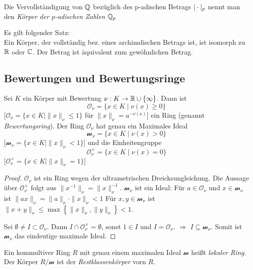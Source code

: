 \documentclass[../main.tex]{subfiles}
\begin{document}
\begin{definition}
    Die Vervollständigung von $\mathbb{Q}$ bezüglich des p-adischen Betrags $|\cdot|_p$ nennt man den \emph{Körper der $p$-adischen Zahlen} $\mathbb{Q}_p$
\end{definition}

\begin{remark}
    Es gilt folgender Satz:\\
    Ein Körper, der vollständig bez. eines archimdischen Betrags ist, ist isomorph zu $\mathbb{R}$ oder $\mathbb{C}$. Der Betrag ist äquivalent zum gewöhnlichen Betrag.
\end{remark}

\subsection{Bewertungen und Bewertungsringe}
\begin{theorem}\label{theo:4.23}
    Sei $K$ ein Körper mit Bewertung $\nu:K\rightarrow\mathbb{R}\cup \{\infty\}$.
    Dann ist $$\mathcal{O}_\nu = \{x\in K\mid \nu(x)\geq0\}$$ [$\mathcal{O}_\nu = \{x\in K\mid \|x\|_\nu \leq 1\}$ für $\|x\|_\nu = a^{-\nu(x)}$] ein Ring (genannt \emph{Bewertungsring}).
    Der Ring $\mathcal{O}_\nu$ hat genau ein Maximales Ideal $$\mathcal{m}_\nu = \{x\in K\mid \nu(x)>0\}$$ [$\mathcal{m}_\nu = \{x\in K\mid \|x\|_\nu <1\}$]
    und die Einheitengruppe $$\mathcal{O}_\nu^\times = \{x\in K\mid \nu(x) = 0\}$$ [$\mathcal{O}_\nu^\times = \{x\in K\mid \|x\|_\nu = 1\}$]
\end{theorem}
\begin{proof}
    $\mathcal{O}_\nu$ ist ein Ring wegen der ultrametrischen Dreicksungleichung.
    Die Aussage über $\mathcal{O}_\nu^\times$ folgt aus $\|x^{-1}\|_\nu = \|x\|_\nu^{-1}$.
    $\mathcal{m}_\nu$ ist ein Ideal: Für $a\in \mathcal{O}_\nu$ und $x\in \mathcal{m}_\nu$ ist $\|ax\|_\nu = \|a\|_\nu \cdot \|x\|_\nu < 1$
    Für $x,y\in \mathcal{m}_\nu$ ist $\|x+y\|_\nu \leq \max\left\{\|x\|_\nu, \|y\|_\nu\right\} < 1$.

    Sei $\emptyset\neq I\subset \mathcal{O}_\nu$. Dann $I\cap \mathcal{O}_\nu^\times = \emptyset$, sonst $1\in I$ und $I=\mathcal{O}_\nu$.
    $\Longrightarrow$ $I\subseteq \mathcal{m}_\nu$.
    Somit ist $\mathcal{m}_\nu$ das eindeutige maximale Ideal.
\end{proof}

\begin{definition}
    Ein kommultiver Ring $R$ mit genau einem maximalen Ideal $\mathcal{m}$ heißt \emph{lokaler Ring}. Der Körper $R/\mathcal{m}$ ist der \emph{Restklassenkörper} vorn $R$.
\end{definition}
\end{document}
